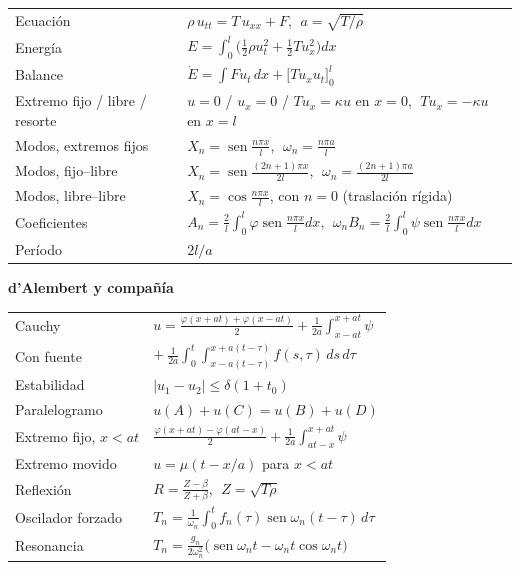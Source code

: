 \documentclass[
  spanish,
  a4paper,
]{scrbook}
\newcounter{none} %
\theoremstyle{definition}
\theoremstyle{plain}
\theoremstyle{definition}
\theoremstyle{plain}
\theoremstyle{definition}
\theoremstyle{remark}
\begin{document}
{\def\LTcaptype{none} %
\begin{longtable}[]{@{}
  >{\raggedright\arraybackslash}p{}
  >{\raggedright\arraybackslash}p{}@{}}
\toprule\noalign{}
\endhead
\bottomrule\noalign{}
\endlastfoot
Ecuación & \(\rho\,u_{tt} = T\,u_{xx} + F\), \(\;a = \sqrt{T/\rho}\) \\
Energía &
\(E = \int_0^l\big(\tfrac12\rho u_t^2 + \tfrac12 T u_x^2\big)dx\) \\
Balance & \(\dot E = \int F u_t\,dx + \big[T u_x u_t\big]_0^l\) \\
Extremo fijo / libre / resorte & \(u = 0\) / \(u_x = 0\) /
\(T u_x = \kappa u\) en \(x=0\), \(\;T u_x = -\kappa u\) en \(x=l\) \\
Modos, extremos fijos & \(X_n = \operatorname{sen}\frac{n\pi x}{l}\),
\(\;\omega_n = \frac{n\pi a}{l}\) \\
Modos, fijo--libre & \(X_n = \operatorname{sen}\frac{(2n+1)\pi x}{2l}\),
\(\;\omega_n = \frac{(2n+1)\pi a}{2l}\) \\
Modos, libre--libre & \(X_n = \cos\frac{n\pi x}{l}\), con \(n = 0\)
(traslación rígida) \\
Coeficientes &
\(A_n = \frac2l\int_0^l\varphi\operatorname{sen}\frac{n\pi x}{l}dx\),
\(\;\omega_nB_n = \frac2l\int_0^l\psi\operatorname{sen}\frac{n\pi x}{l}dx\) \\
Período & \(2l/a\) \\
\end{longtable}
}

\textbf{d'Alembert y compañía}

{\def\LTcaptype{none} %
\begin{longtable}[]{@{}
  >{\raggedright\arraybackslash}p{}
  >{\raggedright\arraybackslash}p{}@{}}
\toprule\noalign{}
\endhead
\bottomrule\noalign{}
\endlastfoot
Cauchy &
\(u = \frac{\varphi(x+at)+\varphi(x-at)}{2} + \frac1{2a}\int_{x-at}^{x+at}\psi\) \\
Con fuente &
\(+\ \frac{1}{2a}\int_0^t\int_{x-a(t-\tau)}^{x+a(t-\tau)}f(s,\tau)\,ds\,d\tau\) \\
Estabilidad & \(\lvert u_1-u_2\rvert \le \delta(1+t_0)\) \\
Paralelogramo & \(u(A)+u(C) = u(B)+u(D)\) \\
Extremo fijo, \(x<at\) &
\(\frac{\varphi(x+at)-\varphi(at-x)}{2} + \frac1{2a}\int_{at-x}^{x+at}\psi\) \\
Extremo movido & \(u = \mu(t - x/a)\) para \(x<at\) \\
Reflexión & \(R = \frac{Z-\beta}{Z+\beta}\), \(\;Z = \sqrt{T\rho}\) \\
Oscilador forzado &
\(T_n = \frac1{\omega_n}\int_0^tf_n(\tau)\operatorname{sen}\omega_n(t-\tau)\,d\tau\) \\
Resonancia &
\(T_n = \frac{g_n}{2\omega_n^2}\big(\operatorname{sen}\omega_nt - \omega_nt\cos\omega_nt\big)\) \\
\end{longtable}
}
\end{document}

